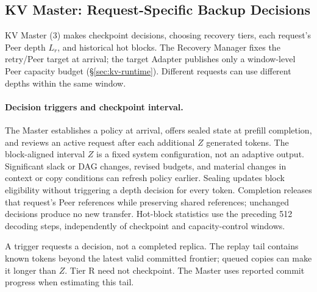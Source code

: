 \subsection{KV Master: Request-Specific Backup Decisions}
\label{sec:kv-placement}
\label{sec:kv-master}

KV Master (3) makes checkpoint decisions, choosing recovery tiers, each request's
Peer depth $L_r$, and historical hot blocks. The Recovery Manager fixes
the retry/Peer target at arrival; the target Adapter publishes only a
window-level Peer capacity budget (\S\ref{sec:kv-runtime}).
Different requests can use different depths within the same window.

\paragraph{Decision triggers and checkpoint interval.}
The Master establishes a policy at arrival, offers sealed state at
prefill completion, and reviews an active request after each additional
$Z$ generated tokens. The block-aligned interval $Z$ is a fixed system
configuration, not an adaptive output. Significant slack or DAG changes, revised budgets,
and material changes in context or copy conditions can refresh policy
earlier. Sealing updates block eligibility without triggering a depth
decision for every token. Completion releases that request's Peer
references while preserving shared references; unchanged decisions
produce no new transfer. Hot-block statistics use the preceding 512
decoding steps, independently of checkpoint and capacity-control windows.

A trigger requests a decision, not a completed replica. The replay tail
contains known tokens beyond the latest valid committed frontier;
queued copies can make it longer than $Z$. Tier R need not checkpoint.
The Master uses reported commit progress when estimating this tail.

